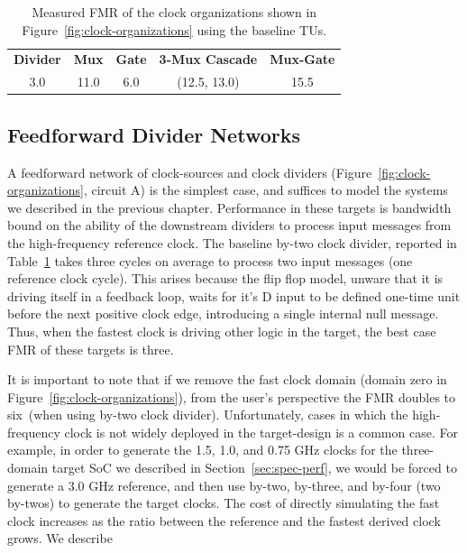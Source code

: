 \begin{table}[t]
\centering
    \begin{tabular}{c c c c c}
    \hline
          \textbf{Divider} & \textbf{Mux} & \textbf{Gate} & \textbf{3-Mux Cascade} & \textbf{Mux-Gate} \\
          3.0 & 11.0 & 6.0 & (12.5, 13.0) & 15.5 \\
    \hline
    \end{tabular}
    \caption{Measured FMR of the clock organizations shown in Figure~\ref{fig:clock-organizations} using the baseline TUs.}
    \label{tbl:pdes-baseline-fmrs}
\end{table}

\subsection{Feedforward Divider Networks}

A feedforward network of clock-sources and clock dividers
(Figure~\ref{fig:clock-organizations}, circuit A) is the simplest case, and
suffices to model the systems we described in the previous chapter. Performance
in these targets is bandwidth bound on the ability of the downstream dividers
to process input messages from the high-frequency reference clock. The baseline
by-two clock divider, reported in Table~\ref{tbl:pdes-baseline-fmrs} takes three cycles on average to process two input
messages (one reference clock cycle). This arises because the flip flop model, unware
that it is driving itself in a feedback loop, waits for it's D input to be defined one-time unit
before the next positive clock edge, introducing a single internal null
message. Thus, when the fastest clock is driving other logic in the target, the
best case FMR of these targets is three.

It is important to note that if we remove the fast clock domain (domain zero in
Figure~\ref{fig:clock-organizations}), from the user's perspective the FMR
doubles to six~(when using by-two clock divider). Unfortunately, cases in which
the high-frequency clock is not widely deployed in the target-design is a
common case. For example, in order to generate the 1.5, 1.0, and 0.75 GHz
clocks for the three-domain target SoC we described in
Section~\ref{sec:spec-perf}, we would be forced to generate a 3.0 GHz
reference, and then use by-two, by-three, and by-four (two by-twos) to generate
the target clocks. The cost of directly simulating the fast clock increases as
the ratio between the reference and the fastest derived clock grows. We describe

